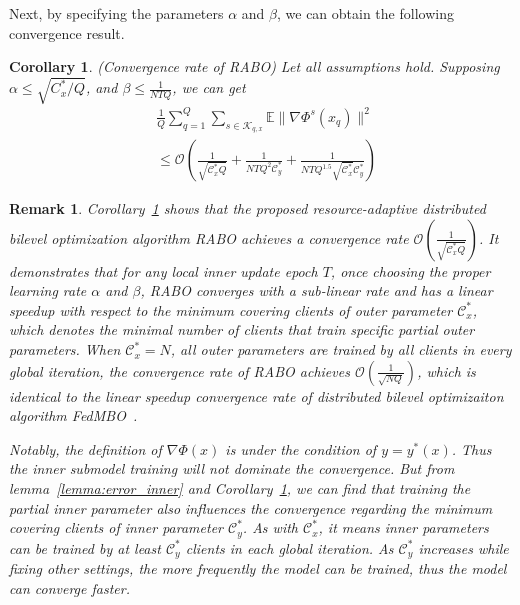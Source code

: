 \documentclass[lettersize,journal]{IEEEtran}
\newtheorem{remark}{Remark}
\newtheorem{corollary}{Corollary}
\begin{document}
Next, by specifying the parameters $\alpha$ and $\beta$, we can obtain the following convergence result.
\begin{corollary}\label{corollary1}
(Convergence rate of RABO) Let all assumptions hold. Supposing  $\alpha\leq \sqrt{C_x^*/Q}$, and $\beta \leq \frac{1}{NTQ}$, we can get
\begin{align}
    &\frac{1}{Q}\sum_{q=1}^Q\sum_{s\in \mathcal{K}_{q,x}}\mathbb{E}\|\nabla \Phi^s(x_{q})\|^2\\&\leq \mathcal{O}(\frac{1}{\sqrt{\mathcal{C}_x^*Q}}+\frac{1}{NTQ^2\mathcal{C}^{*}_{y}}+\frac{1}{NTQ^{1.5}\sqrt{\mathcal{C}_x^*}\mathcal{C}^{*}_{y}})\nonumber
\end{align}
\end{corollary}
\begin{remark}
   Corollary~\ref{corollary1} shows that the proposed resource-adaptive distributed bilevel optimization algorithm \textit{RABO} achieves a convergence rate $\mathcal{O}(\frac{1}{\sqrt{\mathcal{C}_x^*Q}})$. It demonstrates that for any local inner update epoch $T$, once choosing the proper learning rate $\alpha$ and $\beta$, \textit{RABO} converges with a sub-linear rate and has a linear speedup with respect to the minimum covering clients of outer parameter $\mathcal{C}_x^*$, which denotes the minimal number of clients that train specific partial outer parameters.
   When $\mathcal{C}_x^*=N$, all outer parameters are trained by all clients in every global iteration, the convergence rate of \textit{RABO} achieves $\mathcal{O}(\frac{1}{\sqrt{NQ}})$, which is identical to the linear speedup convergence rate of distributed bilevel optimizaiton algorithm \textit{FedMBO}~\cite{conf/icml/fedmbo}. 

   Notably, the definition of $\nabla\Phi(x)$ is under the condition of $y=y^*(x)$. Thus the inner submodel training will not dominate the convergence. But from lemma~\ref{lemma:error_inner} and Corollary~\ref{corollary1}, we can find that training the partial inner parameter also influences the convergence regarding the minimum covering clients of inner parameter $\mathcal{C}_y^*$. As with $\mathcal{C}_x^*$, it means inner parameters can be trained by at least $\mathcal{C}_y^*$ clients in each global iteration. As $\mathcal{C}_y^*$ increases while fixing other settings, the more frequently the model can be trained, thus the model can converge faster.
\end{remark}
\end{document}
